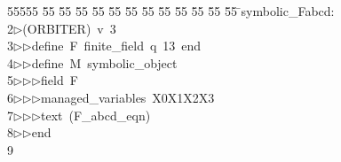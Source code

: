 %
%
\begin{tabbing}
55555 \= 55 \= 55 \= 55 \= 55 \= 55 \= 55 \= 55 \= 55 \= 55 \= 55 \= 55 \= 55 \= \>symbolic\_Fabcd:\\[0pt]
2\>$\triangleright$\>(ORBITER)\ v\ 3\ \\[0pt]
3\>$\triangleright$\>$\triangleright$\>define\ F\ finite\_field\ q\ 13\ end\ \\[0pt]
4\>$\triangleright$\>$\triangleright$\>define\ M\ symbolic\_object\ \\[0pt]
5\>$\triangleright$\>$\triangleright$\>$\triangleright$\>field\ F\ \\[0pt]
6\>$\triangleright$\>$\triangleright$\>$\triangleright$\>managed\_variables\ X0X1X2X3\ \\[0pt]
7\>$\triangleright$\>$\triangleright$\>$\triangleright$\>text\ (F\_abcd\_eqn)\ \\[0pt]
8\>$\triangleright$\>$\triangleright$\>end\\[0pt]
9\>\end{tabbing}
